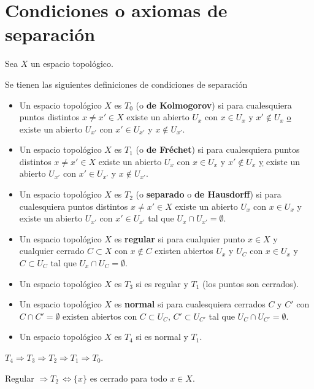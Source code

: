 \section{Condiciones o axiomas de separaci\'on}
Sea $X$ un espacio topol\'ogico. 
\begin{defi} Se tienen las siguientes definiciones de condiciones de separaci\'on 
    \begin{itemize}
        \item Un espacio topol\'ogico $X$ es \textbf{$T_0$} (o \textbf{de Kolmogorov}) si para cualesquiera puntos distintos $x\neq x' \in X$ existe un abierto $U_x$ con $x\in U_x$ y $x'\nin U_x$ \underline{o} existe un abierto $U_{x'}$ con $x'\in U_{x'}$ y $x\nin U_{x'}$.
        \item Un espacio topol\'ogico $X$ es \textbf{$T_1$} (o \textbf{de Fréchet}) si para cualesquiera puntos distintos $x\neq x' \in X$ existe un abierto $U_x$ con $x\in U_x$ y $x'\nin U_x$ \underline{y} existe un abierto $U_{x'}$ con $x'\in U_{x'}$ y $x\nin U_{x'}$. 
        \item Un espacio topol\'ogico $X$ es \textbf{$T_2$} (o \textbf{separado} o \textbf{de Hausdorff}) si para cualesquiera puntos distintos $x\neq x' \in X$ existe un abierto $U_x$ con $x\in U_x$ y existe un abierto $U_{x'}$ con $x'\in U_{x'}$ tal que $U_x\cap U_{x'} = \emptyset$. 
        \item Un espacio topol\'ogico $X$ es \textbf{regular} si para cualquier punto $x \in X$ y cualquier cerrado $C\subset X$ con $x\nin C$ existen abiertos $U_x$ y $U_C$ con $x\in U_x$ y $C\subset U_C$ tal que $U_x\cap U_{C} = \emptyset$.
        \item Un espacio topol\'ogico $X$ es \textbf{$T_3$} si es regular y $T_1$ (los puntos son cerrados). 
        \item Un espacio topol\'ogico $X$ es \textbf{normal} si para cualesquiera cerrados $C$ y $C'$ con $C\cap C'=\emptyset$ existen abiertos con $C \subset U_C, \, C'\subset U_{C'}$ tal que $U_C \cap U_{C'}=\emptyset$. 
        \item Un espacio topol\'ogico $X$ es \textbf{$T_4$} si es normal y $T_1$.  
    \end{itemize}
\end{defi}
\begin{ejer}
    $T_4  \Rightarrow T_3 \Rightarrow T_2 \Rightarrow T_1 \Rightarrow T_0$.

    Regular $\Rightarrow T_2 \, \iff \{x\}$ es cerrado para todo $x\in X$. 
\end{ejer}
